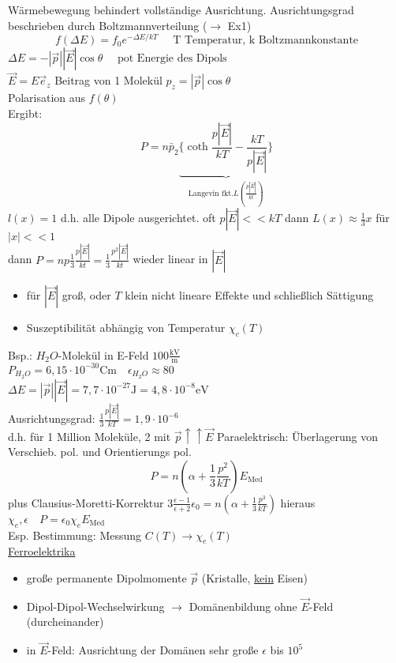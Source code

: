 \documentclass[titlepage,12pt,a4paper,ngerman]{report}
\newcommand{\tx}[1]{\textrm{#1}}
\newcommand{\ub}[1]{\underbrace{#1}}
\begin{document}
Wärmebewegung behindert vollständige Ausrichtung. Ausrichtungsgrad beschrieben durch Boltzmannverteilung ($\rightarrow$ Ex1)
$$f(\Delta E) = f_0 e ^{-\Delta E / kT} \quad \tx{ T Temperatur, k Boltzmannkonstante}$$
$\Delta E = -|\vec{p}| |\vec{E}| \cos \theta \quad \tx{ pot Energie des Dipols}$\\
$\vec{E} = E \vec{e}_z$ Beitrag von 1 Molekül $p_z = |\vec{p}| \cos \theta$\\
Polarisation aus $f(\theta)$\\
Ergibt: $$P = n \bar{p}_2 \ub{\{\coth \frac{p|\vec{E}|}{kT} - \frac{kT}{p|\vec{E}|} \} }_{ \tx{Langevin fkt.} L(\frac{p|\vec{E}|}{kt})}$$
$l(x) = 1$ d.h. alle Dipole ausgerichtet. oft $p|\vec{E}| << kT $ dann $L(x) \approx \frac{1}{3}x $ für $|x| <<1$ \\
dann $P= n p \frac{1}{3} \frac{p|\vec{E}|}{kt} = \frac{1}{3} \frac{p^2|\vec{E}|}{kt}$ wieder linear in $|\vec{E}|$
\begin{itemize}
\item für $|\vec{E}|$ groß, oder $T$ klein nicht lineare Effekte und schließlich Sättigung
\item Suszeptibilität abhängig von Temperatur $\chi_c(T)$
\end{itemize}
Bsp.: $H_2O$-Molekül in E-Feld $100\frac{\tx{kV}}{\tx{m}}$\\
$P_{H_2O} = 6,15 \cdot 10^{-30} \tx{Cm} \quad \epsilon_{H_2O} \approx 80$\\
$\Delta E = |\vec{p}||\vec{E}| = 7,7 \cdot 10^{-27} \tx{J} = 4,8 \cdot 10^{-8} \tx{eV}$\\
Ausrichtungsgrad: $\frac{1}{3} \frac{p|\vec{E}|}{kT} = 1,9 \cdot 10^{-6}$\\
d.h. für 1 Million Moleküle, 2 mit $\vec{p}\uparrow \uparrow \vec{E}$
Paraelektrisch: Überlagerung von Verschieb. pol. und Orientierungs pol.\\
$$P = n(\alpha + \frac{1}{3} \frac{p^2}{kT}) E_{\tx{Med}}$$
plus Clausius-Moretti-Korrektur $ 3\frac{\epsilon-1}{\epsilon +2} \epsilon_0 = n ( \alpha + \frac{1}{3} \frac{p^3}{kT})$
hieraus $\chi_e, \epsilon \quad P = \epsilon_0 \chi_e E_{\tx{Med}}$\\
Esp. Bestimmung: Messung $C(T) \rightarrow \chi_e(T)$\\
\underline{Ferroelektrika}
\begin{itemize}
\item große permanente Dipolmomente $\vec{p}$ (Kristalle, \underline{kein} Eisen)
\item Dipol-Dipol-Wechselwirkung $\rightarrow$ Domänenbildung
ohne $\vec{E}$-Feld (durcheinander)
\item in $\vec{E}$-Feld: Ausrichtung der Domänen sehr große $\epsilon$ bis $10^5$
\end{itemize}
\end{document}
